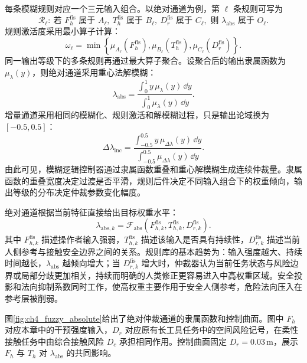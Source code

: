 每条模糊规则对应一个三元输入组合。以绝对通道为例，第 $\ell$ 条规则可写为
\begin{equation}
  \mathcal R_{\ell}:\
  \text{若 }F_h^{\mathrm{fis}}\text{ 属于 }A_{\ell},\
  T_h^{\mathrm{fis}}\text{ 属于 }B_{\ell},\
  D_r^{\mathrm{fis}}\text{ 属于 }C_{\ell},
  \text{ 则 }\lambda_{\mathrm{abs}}\text{ 属于 }O_{\ell}.
  \label{eq:ch4_fuzzy_rule}
\end{equation}
规则激活度采用最小算子计算：
\begin{equation}
  \omega_{\ell}=
  \min\left\{
  \mu_{A_{\ell}}(F_h^{\mathrm{fis}}),
  \mu_{B_{\ell}}(T_h^{\mathrm{fis}}),
  \mu_{C_{\ell}}(D_r^{\mathrm{fis}})
  \right\}.
  \label{eq:ch4_rule_activation}
\end{equation}
同一输出等级下的多条规则再通过最大算子聚合。设聚合后的输出隶属函数为 $\mu_{\lambda}(y)$，则绝对通道采用重心法解模糊：
\begin{equation}
  \lambda_{\mathrm{abs}}=
  \frac{\int_0^1 y\,\mu_{\lambda}(y)\,\dd y}
  {\int_0^1 \mu_{\lambda}(y)\,\dd y}.
  \label{eq:ch4_centroid_abs}
\end{equation}
增量通道采用相同的模糊化、规则激活和解模糊过程，只是输出论域换为 $[-0.5,0.5]$：
\begin{equation}
  \Delta\lambda_{\mathrm{inc}}=
  \frac{\int_{-0.5}^{0.5} y\,\mu_{\Delta\lambda}(y)\,\dd y}
  {\int_{-0.5}^{0.5} \mu_{\Delta\lambda}(y)\,\dd y}.
  \label{eq:ch4_centroid_inc}
\end{equation}
由此可见，模糊逻辑控制器通过隶属函数重叠和重心解模糊生成连续仲裁量。隶属函数的重叠宽度决定过渡是否平滑，规则后件决定不同输入组合下的权重倾向，输出等级的分布决定仲裁参数变化幅度。

绝对通道根据当前特征直接给出目标权重水平：
\begin{equation}
  \lambda_{\mathrm{abs},k}=
  \mathcal F_{\mathrm{abs}}\left(
  F_{h,k}^{\mathrm{fis}},
  T_{h,k}^{\mathrm{fis}},
  D_{r,k}^{\mathrm{fis}}
  \right).
  \label{eq:ch4_abs_channel}
\end{equation}
其中 $F_{h,k}^{\mathrm{fis}}$ 描述操作者输入强弱，$T_{h,k}^{\mathrm{fis}}$ 描述该输入是否具有持续性，$D_{r,k}^{\mathrm{fis}}$ 描述当前人侧参考与接触安全边界之间的关系。规则库的基本趋势为：输入强度越大、持续时间越长，$\lambda_{\mathrm{abs}}$ 越倾向增大；当 $D_{r,k}^{\mathrm{fis}}$ 增大时，仲裁器认为当前任务状态与风险边界或局部分歧更加相关，持续而明确的人类修正更容易进入中高权重区域。安全投影和法向抑制系数同时工作，使高权重主要作用于安全人侧参考，危险法向压入在参考层被削弱。

图\ref{fig:ch4_fuzzy_absolute}给出了绝对仲裁通道的隶属函数和控制曲面。图中 $F_h$ 对应本章中的干预强度输入，$D_r$ 对应原有长工具任务中的空间风险记号，在柔性接触任务中由综合接触风险 $D_c$ 承担相同作用。控制曲面固定 $D_r=0.03\,\mathrm{m}$，展示 $F_h$ 与 $T_h$ 对 $\lambda_{\mathrm{abs}}$ 的共同影响。

